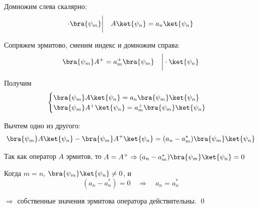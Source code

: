 Домножим слева скалярно:
$$
\cdot\bra{\psi_m}\bigg|\quad A\ket{\psi_n}=a_n\ket{\psi_n}
$$

Сопряжем эрмитово, сменим индекс и домножим справа:
$$
	\bra{\psi_m}A^+=a_m^+\bra{\psi_m} \quad\bigg|\cdot\ket{\psi_n}
$$

Получим
$$\begin{cases}
	\bra{\psi_m}A\ket{\psi_n}=a_n\bra{\psi_m}\ket{\psi_n}\\
	\bra{\psi_m}A^+\ket{\psi_n}=a_m^+\bra{\psi_m}\ket{\psi_n}
\end{cases}$$

Вычтем одно из другого:
$$
	\bra{\psi_m}A\ket{\psi_n}-\bra{\psi_m}A^+\ket{\psi_n}=
	(a_n-a_m^*)\bra{\psi_m}\ket{\psi_n}
$$

Так как оператор $A$ эрмитов, то $A=A^+\Rightarrow(a_n-a_m^*)\bra{\psi_m}\ket{\psi_n}=0$

Когда $m=n$, $\bra{\psi_m}\ket{\psi_n}\ne0$, и 
$$
	(a_n-a_n^*)=0 \quad\Rightarrow\quad a_n=a_n^*
$$

$\Rightarrow$ собственные значения эрмитова оператора действительны. \qed

